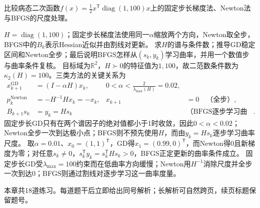 \label{struct:V1-C08-CH11}
\begin{example}[病态二次函数的三种尺度处理]\label{exm:V1-C08-preconditioning}
比较病态二次函数$f(x)=\tfrac12x^{\mathsf T}\operatorname{diag}(1,100)x$上的固定步长梯度法、Newton法与BFGS的尺度处理。
\end{example}
\begin{solution}
\SolGiven $H=\operatorname{diag}(1,100)$；固定步长梯度法使用同一$\alpha$缩放两个方向，Newton取全步，BFGS中的$B_k$表示Hessian近似并由割线对更新。
\SolPlan 求$H$的谱与条件数；推导GD稳定区间和Newton全步；最后说明BFGS怎样从$(s_k,y_k)$学习曲率，并用一个数值步与曲率条件复核。
\SolDerive
目标域为$\mathbb R^2$，$H\succ0$的特征值为$1,100$，故二范数条件数为$\kappa_2(H)=100$。三类方法的关键关系为
\[
\begin{aligned}
x_{k+1}^{\mathrm{GD}}&=(I-\alpha H)x_k,
&0<\alpha<\frac{2}{\lambda_{\max}(H)}=0.02,\\
p_k^{\mathrm{Newton}}&=-H^{-1}Hx_k=-x_k,
&x_{k+1}&=0\quad\text{（全步）},\\
B_{k+1}s_k&=y_k=Hs_k
&&\text{（BFGS逐步学习曲率尺度）}.
\end{aligned}
\]
固定步长GD只有在两个谱因子的绝对值都小于1时收敛，因此$0<\alpha<0.02$；Newton全步一次到达极小点；BFGS则不预先使用$H$，而由$y_k=Hs_k$逐步学习曲率尺度。
\SolCheck 取$\alpha=0.01$、$x_0=(1,1)^{\mathsf T}$，GD得$x_1=(0.99,0)^{\mathsf T}$，而Newton得$0$且新梯度为零；对任意$s_k\ne0$，$s_k^{\mathsf T}y_k=s_k^{\mathsf T}Hs_k>0$，BFGS正定更新的曲率条件成立。
\SolAnswer 固定步长GD受$\lambda_{\max}=100$约束而在低曲率方向缓慢；Newton用$H^{-1}$消除尺度并全步一次到达$0$；BFGS则通过割线对逐步学习这一曲率度量。
\end{solution}

\begin{chapterexercisebox}
\label{struct:V1-C08-CH34}
\label{struct:V1-C08-CH35}
本章共18道练习。每道题干后立即给出同号解析；长解析可自然跨页，续页标题保留题号。
\end{chapterexercisebox}

